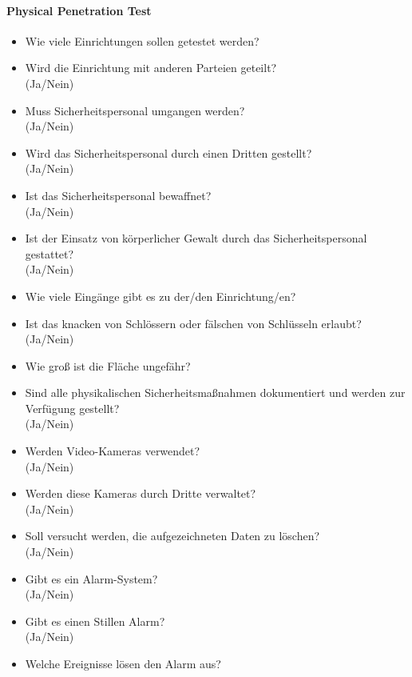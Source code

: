 \paragraph{Physical Penetration Test}
\begin{itemize}
	\item Wie viele Einrichtungen sollen getestet werden?
	\item Wird die Einrichtung mit anderen Parteien geteilt?\\
	(Ja/Nein)
	\item Muss Sicherheitspersonal umgangen werden?\\
	(Ja/Nein)
	\item Wird das Sicherheitspersonal durch einen Dritten gestellt?\\
	(Ja/Nein)
	\item Ist das Sicherheitspersonal bewaffnet?\\
	(Ja/Nein)
	\item Ist der Einsatz von körperlicher Gewalt durch das Sicherheitspersonal gestattet?\\
	(Ja/Nein)
	\item Wie viele Eingänge gibt es zu der/den Einrichtung/en?
	\item Ist das knacken von Schlössern oder fälschen von Schlüsseln erlaubt?\\
	(Ja/Nein)
	\item Wie groß ist die Fläche ungefähr?
	\item Sind alle physikalischen Sicherheitsmaßnahmen dokumentiert und werden zur Verfügung gestellt?\\
	(Ja/Nein)
	\item Werden Video-Kameras verwendet?\\
	(Ja/Nein)
	\item Werden diese Kameras durch Dritte verwaltet?\\
	(Ja/Nein)
	\item Soll versucht werden, die aufgezeichneten Daten zu löschen?\\
	(Ja/Nein)
	\item Gibt es ein Alarm-System?\\
	(Ja/Nein)
	\item Gibt es einen Stillen Alarm?\\
	(Ja/Nein)
	\item Welche Ereignisse lösen den Alarm aus?
\end{itemize}

